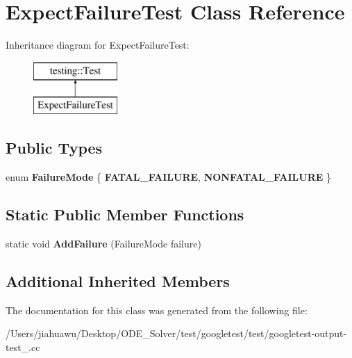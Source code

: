 \hypertarget{class_expect_failure_test}{}\section{Expect\+Failure\+Test Class Reference}
\label{class_expect_failure_test}
Inheritance diagram for Expect\+Failure\+Test\+:\begin{figure}[H]
\begin{center}
\leavevmode
\includegraphics[height=2.000000cm]{class_expect_failure_test}
\end{center}
\end{figure}
\subsection*{Public Types}
\begin{DoxyCompactItemize}
\item 
\mbox{\label{class_expect_failure_test_aad05da10bb15d21a434eba3b37011406}} 
enum {\bfseries Failure\+Mode} \{ {\bfseries F\+A\+T\+A\+L\+\_\+\+F\+A\+I\+L\+U\+RE}, 
{\bfseries N\+O\+N\+F\+A\+T\+A\+L\+\_\+\+F\+A\+I\+L\+U\+RE}
 \}
\end{DoxyCompactItemize}
\subsection*{Static Public Member Functions}
\begin{DoxyCompactItemize}
\item 
\mbox{\label{class_expect_failure_test_ab9aeb7820ff7953fc2975ecc5abd046b}} 
static void {\bfseries Add\+Failure} (Failure\+Mode failure)
\end{DoxyCompactItemize}
\subsection*{Additional Inherited Members}


The documentation for this class was generated from the following file\+:\begin{DoxyCompactItemize}
\item 
/\+Users/jiahuawu/\+Desktop/\+O\+D\+E\+\_\+\+Solver/test/googletest/test/googletest-\/output-\/test\+\_\+.\+cc\end{DoxyCompactItemize}
